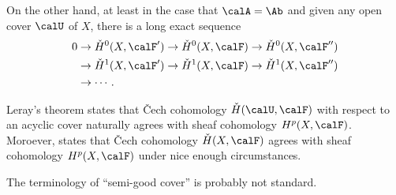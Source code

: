 \begin{remark}
    On the other hand, at least in the case that $\calA = \Ab$ and given any open cover $\calU$ of $X$, there is a long exact sequence
    \begin{align*}
    0 &\to \check{H}^0(X, \calF') \to  \check{H}^0(X, \calF) \to \check{H}^0(X, \calF'')  \\
    &\to \check{H}^1(X, \calF') \to \check{H}^1(X, \calF) \to \check{H}^1(X, \calF'') \\
    &\to \cdots.
    \end{align*}
\end{remark}







Leray's theorem  states that \v{C}ech cohomology $\check{H}(\calU, \calF)$ with respect to an acyclic cover naturally agrees with sheaf cohomology $H^p(X, \calF)$. Moroever,  states that \v{C}ech cohomology $\check{H}(X, \calF)$ agrees with sheaf cohomology $H^p(X,\calF)$ under nice enough circumstances. 






\begin{remark}
    The terminology of ``semi-good cover'' is probably not standard. 
\end{remark}



